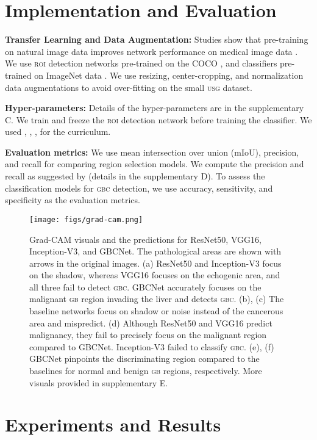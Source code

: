 \documentclass[10pt,twocolumn,letterpaper]{article}
\def\usg{\textsc{usg}\xspace}
\def\gbc{\textsc{gbc}\xspace}
\def\gb{\textsc{gb}\xspace}
\def\roi{\textsc{roi}\xspace}
\newcommand{\myfirstpara}[1]{\noindent \textbf{#1:}}
\newcommand{\mypara}[1]{\vspace{0.1em} \myfirstpara{#1}}
\begin{document}
\section{Implementation and Evaluation}

\myfirstpara{Transfer Learning and Data Augmentation}
Studies show that pre-training on natural image data improves network performance on medical image data \cite{alzubaidi2020transferlearning, cheng2017transfer}. We use \roi detection networks pre-trained on the COCO \cite{coco}, and classifiers pre-trained on ImageNet data \cite{imagenet}. We use resizing, center-cropping, and normalization data augmentations to avoid over-fitting on the small \usg dataset.

\mypara{Hyper-parameters}
Details of the hyper-parameters are in the supplementary C. We train and freeze the \roi detection network before training the classifier. We used , , , for the curriculum.

\mypara{Evaluation metrics}
We use mean intersection over union (mIoU), precision, and recall for comparing region selection models. We compute the precision and recall as suggested by \cite{ribli2018detecting} (details in the supplementary D). To assess the classification models for \gbc detection, we use accuracy, sensitivity, and specificity as the evaluation metrics. 

 
\begin{figure}[t]
	\centering
	\texttt{[image: figs/grad-cam.png]}
	\caption{Grad-CAM visuals and the predictions for ResNet50, VGG16, Inception-V3, and GBCNet. The pathological areas are shown with arrows in the original images. 
	(a) ResNet50 and Inception-V3 focus on the shadow, whereas VGG16 focuses on the echogenic area, and all three fail to detect \gbc. GBCNet accurately focuses on the malignant \gb region invading the liver and detects \gbc.  (b), (c) The baseline networks focus on shadow or noise instead of the cancerous area and mispredict. 
	(d) Although ResNet50 and VGG16 predict malignancy, they fail to precisely focus on the malignant region compared to GBCNet. Inception-V3 failed to classify \gbc. (e), (f) GBCNet pinpoints the discriminating region compared to the baselines for normal and benign \gb regions, respectively. More visuals provided in supplementary E.} \label{fig:gbc_vis}
\end{figure}

\section{Experiments and Results}
\end{document}

